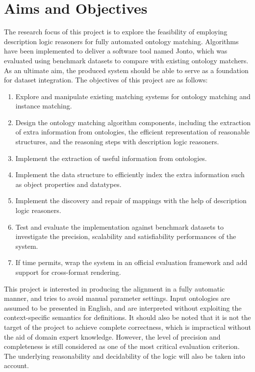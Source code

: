 \section{Aims and Objectives}

The research focus of this project is to explore the feasibility of employing description logic reasoners for fully automated ontology matching. Algorithms have been implemented to deliver a software tool named Jonto, which was evaluated using benchmark datasets to compare with existing ontology matchers. As an ultimate aim, the produced system should be able to serve as a foundation for dataset integration. The objectives of this project are as follows:

\begin{spacing}{1.2}
\begin{enumerate}
	\item Explore and manipulate existing matching systems for ontology matching and instance matching.
	\item Design the ontology matching algorithm components, including the extraction of extra information from ontologies, the efficient representation of reasonable structures, and the reasoning steps with description logic reasoners.
    \item Implement the extraction of useful information from ontologies.
    \item Implement the data structure to efficiently index the extra information such as object properties and datatypes.
	\item Implement the discovery and repair of mappings with the help of description logic reasoners.
	\item Test and evaluate the implementation against benchmark datasets to investigate the precision, scalability and satisfiability performances of the system.
    \item If time permits, wrap the system in an official evaluation framework and add support for cross-format rendering.
\end{enumerate}
\end{spacing}

This project is interested in producing the alignment in a fully automatic manner, and tries to avoid manual parameter settings. Input ontologies are assumed to be presented in English, and are interpreted without exploiting the context-specific semantics for definitions. It should also be noted that it is not the target of the project to achieve complete correctness, which is impractical without the aid of domain expert knowledge. However, the level of precision and completeness is still considered as one of the most critical evaluation criterion. The underlying reasonability and decidability of the logic will also be taken into account.



